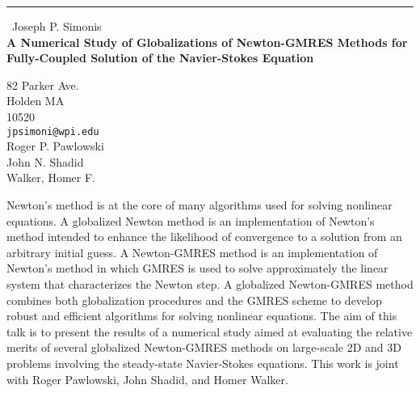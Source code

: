 \documentclass{report}
\begin{document}
\begin{center}
\rule{6in}{1pt} \
{\large Joseph P. Simonis \\
{\bf A Numerical Study of Globalizations of Newton-GMRES Methods for Fully-Coupled Solution of the Navier-Stokes Equation}}

82 Parker Ave. \\ Holden MA \\ 10520
\\
{\tt jpsimoni@wpi.edu}\\
Roger P. Pawlowski\\
John N. Shadid\\
	Walker, Homer F.\end{center}

Newton's method is at the core of many algorithms used for
solving nonlinear equations. A globalized Newton method is
an implementation of Newton's method intended to enhance the
likelihood of convergence to a solution from an arbitrary
initial guess. A Newton-GMRES method is an implementation of
Newton's method in which GMRES is used to solve approximately
the linear system that characterizes the Newton step. A
globalized Newton-GMRES method combines both globalization
procedures and the GMRES scheme to develop robust and efficient
algorithms for solving nonlinear equations. The aim of this
talk is to present the results of a numerical study
aimed at evaluating the relative merits of several globalized
Newton-GMRES methods on large-scale 2D and 3D problems
involving the steady-state Navier-Stokes equations. This work
is joint with Roger Pawlowski, John Shadid, and Homer Walker.
\end{document}

